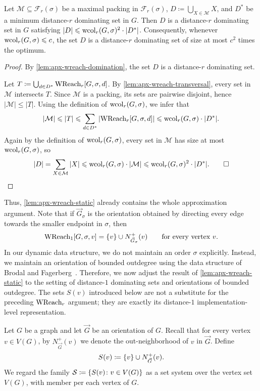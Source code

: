 \begin{lemma}\label{lem:apx-wreach-static}
Let $\mathcal{M}\subseteq \mathcal{F}_r(\sigma)$ be a maximal packing in $\mathcal{F}_r(\sigma)$, $D\coloneqq\bigcup_{X\in \mathcal{M}} X$, and $D^*$ be a minimum distance-$r$ dominating set in $G$.
Then $D$ is a distance-$r$ dominating set in $G$ satisfying \mbox{$|D|\leqslant \textrm{wcol}_r(G,\sigma)^2\cdot |D^*|$.}
Consequently, whenever $\textrm{wcol}_r(G,\sigma)\leqslant c$, the set $D$ is a distance-$r$ dominating set of size at most $c^2$ times the optimum.
\end{lemma}
\begin{proof}
By \cref{lem:apx-wreach-domination}, the set $D$ is a distance-$r$ dominating set.

Let $T\coloneqq\bigcup_{d\in D^*} \textrm{WReach}_r[G,\sigma,d]$.
By \cref{lem:apx-wreach-transversal}, every set in $\mathcal{M}$ intersects $T$.
Since $\mathcal{M}$ is a packing, its sets are pairwise disjoint, hence $|\mathcal{M}|\le |T|$.
Using the definition of $\textrm{wcol}_r(G,\sigma)$, we infer that
\[|\mathcal{M}|\leqslant |T|\leqslant \sum_{d\in D^*} |\textrm{WReach}_r[G,\sigma,d]|\leqslant \textrm{wcol}_r(G,\sigma)\cdot |D^*|.\]
Again by the definition of $\textrm{wcol}_r(G,\sigma)$, every set in $\mathcal{M}$ has size at most $\textrm{wcol}_r(G,\sigma)$, so
\[|D| = \sum_{X\in \mathcal{M}} |X| \leqslant \textrm{wcol}_r(G,\sigma)\cdot |\mathcal{M}| \leqslant \textrm{wcol}_r(G,\sigma)^2\cdot |D^*|.\qed\]
\end{proof}

Thus, \cref{lem:apx-wreach-static} already contains the whole approximation argument.
Note that if $\vec{G}_\sigma$ is the orientation obtained by directing every edge towards the smaller endpoint in $\sigma$, then \[\textrm{WReach}_1[G,\sigma,v]=\{v\}\cup N^+_{\vec{G}_\sigma}(v)\qquad\textrm{for every vertex }v.\]
In our dynamic data structure, we do not maintain an order $\sigma$ explicitly. Instead, we maintain an orientation of bounded outdegree using the data structure of Brodal and Fagerberg~\cite{BrodalF99}.
Therefore, we now adjust the result of \cref{lem:apx-wreach-static} to the setting of distance-$1$ dominating sets and orientations of bounded outdegree.
The sets $S(v)$ introduced below are not a substitute for the preceding $\textrm{WReach}_r$ argument; they are exactly its distance-$1$ implementation-level representation.

Let $G$ be a graph and let $\vec{G}$ be an orientation of $G$.
Recall that for every vertex $v\in V(G)$, by $N^+_{\vec{G}}(v)$ we denote the out-neighborhood of $v$ in $\vec{G}$. Define \[S(v)\coloneqq\{v\}\cup N^+_{\vec{G}}(v).\]
We regard the family ${\mathcal S}\coloneqq \{S(v) \colon v\in V(G)\}$ as a set system over the vertex set $V(G)$, with member per each vertex of $G$.

